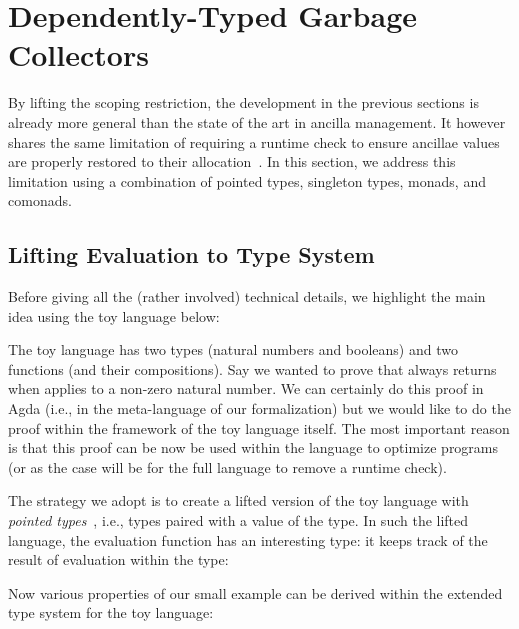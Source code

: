 \documentclass[sigplan,10pt,review,anonymous]{acmart}
\begin{document}

\section{Dependently-Typed Garbage Collectors}
\label{sec:dep}

By lifting the scoping restriction, the development in the previous
sections is already more general than the state of the art in ancilla
management.  It however shares the same limitation of requiring a
runtime check to ensure ancillae values are properly restored to their
allocation~\cite{10.1007/978-3-319-20860-2_13,Green:2013:QSQ:2491956.2462177}.
In this section, we address this limitation using a combination of
pointed types, singleton types, monads, and comonads.

\subsection{Lifting Evaluation to Type System}

Before giving all the (rather involved) technical details, we
highlight the main idea using the toy language below:

\Jexample{}

The toy language has two types (natural numbers and booleans) and two
functions (and their compositions). Say we wanted to prove that
 always returns
 when applies to a non-zero natural
number. We can certainly do this proof in Agda (i.e., in the
meta-language of our formalization) but we would like to do the proof
within the framework of the toy language itself. The most important
reason is that this proof can be now be used within the language to
optimize programs (or as the case will be for the full language to
remove a runtime check).

The strategy we adopt is to create a lifted version of the toy
language with \emph{pointed types}~\cite{XXX}, i.e., types paired with
a value of the type. In such the lifted language, the evaluation
function has an interesting type: it keeps track of the result of
evaluation within the type:

\Jexamplecont{}

Now various properties of our small example
 can be derived within
the extended type system for the toy language:
\end{document}
